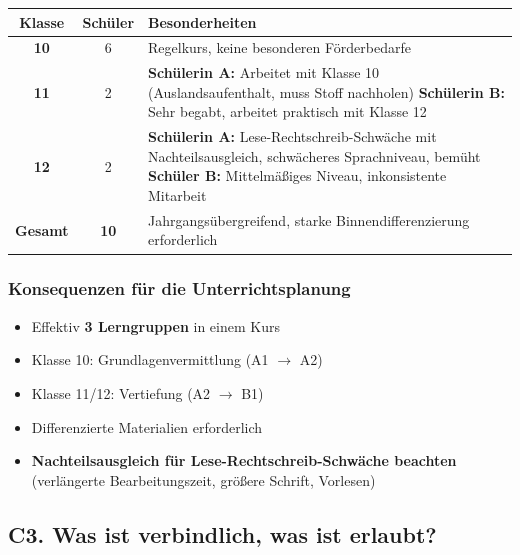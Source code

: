 \documentclass[10pt,a4paper]{article}
\begin{document}
\begin{center}
\small
\begin{tabular}{|c|c|p{10cm}|}
\hline
\rowcolor{lightgray}
\textbf{Klasse} & \textbf{Schüler} & \textbf{Besonderheiten} \\
\hline
\textbf{10} & 6 & Regelkurs, keine besonderen Förderbedarfe \\
\hline
\textbf{11} & 2 & \textbf{Schülerin A:} Arbeitet mit Klasse 10 (Auslandsaufenthalt, muss Stoff nachholen) \newline \textbf{Schülerin B:} Sehr begabt, arbeitet praktisch mit Klasse 12 \\
\hline
\textbf{12} & 2 & \textbf{Schülerin A:} Lese-Rechtschreib-Schwäche mit Nachteilsausgleich, schwächeres Sprachniveau, bemüht \newline \textbf{Schüler B:} Mittelmäßiges Niveau, inkonsistente Mitarbeit \\
\hline
\rowcolor{lightspaet}
\textbf{Gesamt} & \textbf{10} & Jahrgangsübergreifend, starke Binnendifferenzierung erforderlich \\
\hline
\end{tabular}
\end{center}

\subsubsection{Konsequenzen für die Unterrichtsplanung}

\begin{itemize}[noitemsep]
\item Effektiv \textbf{3 Lerngruppen} in einem Kurs
\item Klasse 10: Grundlagenvermittlung (A1 $\rightarrow$ A2)
\item Klasse 11/12: Vertiefung (A2 $\rightarrow$ B1)
\item Differenzierte Materialien erforderlich
\item \textbf{Nachteilsausgleich für Lese-Rechtschreib-Schwäche beachten} (verlängerte Bearbeitungszeit, größere Schrift, Vorlesen)
\end{itemize}

\subsection{C3. Was ist verbindlich, was ist erlaubt?}
\end{document}
